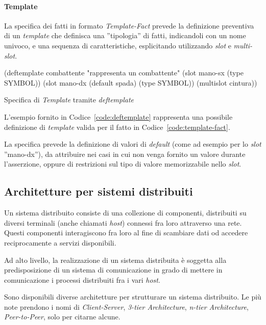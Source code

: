 \paragraph{Template}
La specifica dei fatti in formato \emph{Template-Fact} prevede la definizione preventiva di un \emph{template} che definisca una ''tipologia'' di fatti, indicandoli con un nome univoco, e una sequenza di caratteristiche, esplicitando utilizzando \emph{slot} e \emph{multi-slot}.

\begin{program}
\begin{verbatimtab}

(deftemplate combattente "rappresenta un combattente"
	(slot mano-sx 
		(type SYMBOL))
	(slot mano-dx
		(default spada)
		(type SYMBOL))
	(multislot cintura))
\end{verbatimtab}
\caption{Specifica di \emph{Template} tramite \emph{deftemplate}}\label{code:deftemplate}
\end{program}

L'esempio fornito in Codice~\ref{code:deftemplate} rappresenta una possibile definizione di \emph{template} valida per il fatto in Codice~\ref{code:template-fact}.

La specifica prevede la definizione di valori di \emph{default} (come ad esempio per lo \emph{slot} ''mano-dx''), da attribuire nei casi in cui non venga fornito un valore durante l'asserzione, oppure di restrizioni sul tipo di valore memorizzabile nello \emph{slot}.

\subsection{Architetture per sistemi distribuiti}

Un sistema distribuito consiste di una collezione di componenti, distribuiti su diversi terminali (anche chiamati \emph{host}) connessi fra loro attraverso una rete. Questi componenti interagiscono fra loro al fine di scambiare dati od accedere reciprocamente a servizi disponibili.~\cite{Mascolo:2002:MCM:770420.770423}

Ad alto livello, la realizzazione di un sistema distribuita è soggetta alla predisposizione di un sistema di comunicazione in grado di mettere in comunicazione i processi distribuiti fra i vari \emph{host}.

Sono disponibili diverse architetture per strutturare un sistema distribuito. Le più note prendono i nomi di \emph{Client-Server}, \emph{3-tier Architecture}, \emph{n-tier Architecture}, \emph{Peer-to-Peer}, solo per citarne alcune.

